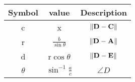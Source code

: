 \begin{tabular}{|c|c|c|}
\hline
Symbol & value & Description\\
\hline
c & x & $\left\lVert\mathbf{D} - \mathbf{C}\right\rVert$\\
\hline
r & $\frac{b}{\sin{\theta}}$ & $\left\lVert\mathbf{D} - \mathbf{A}\right\rVert$ \\
\hline
d & r$\cos{\theta}$ & $\left\lVert\mathbf{D} - \mathbf{E}\right\rVert$ \\
\hline
$\theta$ & $\sin^{-1}\frac{a}{c}$ & $\angle{D}$ \\
\hline
\end{tabular}

